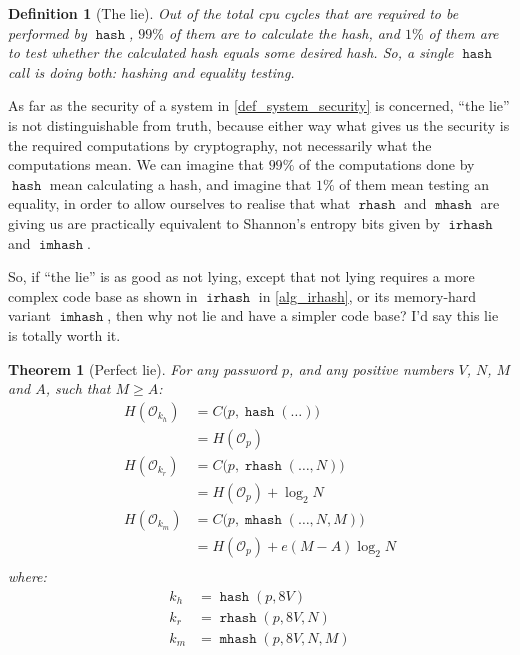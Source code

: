 \documentclass[twocolumn]{article}
\newtheorem{definition}{Definition}[section]
\newtheorem{theorem}{Theorem}[section]
\DeclareMathOperator{\hash}{\mathtt{hash}}
\DeclareMathOperator{\rhash}{\mathtt{rhash}}
\DeclareMathOperator{\mhash}{\mathtt{mhash}}
\DeclareMathOperator{\irhash}{\mathtt{irhash}}
\DeclareMathOperator{\imhash}{\mathtt{imhash}}
\begin{document}
\begin{definition}[The lie]
    Out of the total \gls{cpu} cycles that are required to be performed by
    $\hash$, $99\%$ of them are to calculate the hash, and $1\%$ of them
    are to test whether the calculated hash equals some desired hash.  So,
    a single $\hash$ call is doing both: hashing and equality testing.
\end{definition}

As far as the security of a system in \cref{def_system_security} is
concerned, ``the lie'' is not distinguishable from truth, because either
way what gives us the security is the required computations by
cryptography, not necessarily what the computations mean.  We can imagine
that $99\%$ of the computations done by $\hash$ mean calculating a hash,
and imagine that $1\%$ of them mean testing an equality, in order to allow
ourselves to realise that what $\rhash$ and $\mhash$ are giving us are
practically equivalent to Shannon's entropy bits given by $\irhash$ and
$\imhash$.

So, if ``the lie'' is as good as not lying, except that not lying requires
a more complex code base as shown in $\irhash$ in \cref{alg_irhash}, or its
memory-hard variant $\imhash$, then why not lie and have a simpler code
base?  I'd say this lie is totally worth it.

\begin{theorem}[Perfect lie] \label{theorem_perfect_lie}
    For any password $p$, and any positive numbers $V$, $N$, $M$ and $A$,
    such that $M \ge A$:
    \[\begin{split}
        H(\mathcal{O}_{k_h}) 
            &= C\Big(p, \hash(\ldots)\Big) \\
            &= H(\mathcal{O}_p) \\
        H(\mathcal{O}_{k_r}) 
            &= C\Big(p, \rhash(\ldots, N)\Big) \\
            &= H(\mathcal{O}_p) + \log_2 N \\
        H(\mathcal{O}_{k_m}) 
            &= C\Big(p, \mhash(\ldots, N, M)\Big) \\
            &= H(\mathcal{O}_p) + e(M-A)\log_2 N \\
    \end{split}\]
    where:
    \[\begin{split}
        k_h &= \hash(p, 8V) \\
        k_r &= \rhash(p, 8V, N) \\
        k_m &= \mhash(p, 8V, N, M) \\
    \end{split}\]
\end{theorem}
\end{document}
